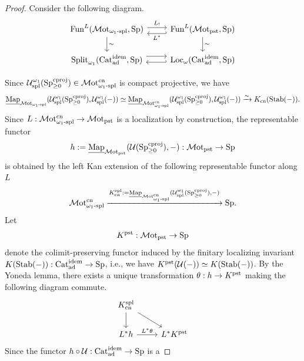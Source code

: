 \documentclass[a4paper,10pt, oneside]{amsart}
\begin{document}
\begin{proof}
	Consider the following diagram.
	$$\begin{tikzcd}
		{\funct^L(\motomegaonespl,\opsp)} \arrow[d, "\sim"] \arrow[r, "L_!",shift left] & {\funct^L(\motpst,\opsp)} \arrow[l, "L^*",hook', shift left=2] \arrow[d, "\sim"] \\
		{\Split_{\omega_1}(\catadidem,\opsp)} \arrow[r, shift left=2]                    & {\Loc_\omega(\catadidem,\opsp)} \arrow[l, hook', shift left]            
	\end{tikzcd}$$

	Since $\mcu_{\op{spl}}^{\omega_1}(\spgeqcproj)\in \motomegaonesplcn$ is compact projective, we have $$\unmap_{\motomegaonespl}(\mcu_{\op{spl}}^{\omega_1}(\spgeqcproj),\mcu_{\op{spl}}^{\omega_1}(-))\simeq\unmap_{\motomegaonesplcn}(\mcu_{\op{spl}}^{\omega_1}(\spgeqcproj),\mcu_{\op{spl}}^{\omega_1}(-))\xrightarrow{\sim} \kcn(\op{Stab}(-)).$$
	Since $L:\motomegaonesplcn\to \motpst$ is a localization by construction, the representable functor $$h:=\unmap_{\motpst}(\mcu(\spgeqcproj),-):\motpst\to \opsp$$ is obtained by the left Kan extension  of the following representable functor along $L$ $$\motomegaonesplcn\xrightarrow{\kcn^{\op{spl}}:=\unmap_{\motomegaonesplcn}(\mcu_{\op{spl}}^{\omega_1}(\spgeqcproj),-)}\opsp.$$
	Let $$K^{\op{pst}}:\motpst\to\opsp$$ denote the colimit-preserving functor induced by the finitary localizing invariant $K(\stab(-)):\catadidem\to \opsp$, i.e., we have $K^{\op{pst}}(\mcu(-))\simeq K(\stab(-))$.
	By the Yoneda lemma, there exists a unique transformation $\theta:h\to K^{\op{pst}}$ making the following diagram  commute.
	$$\begin{tikzcd}
		\kcn^{\op{spl}} \arrow[d] \arrow[rd] &                  \\
		L^*h \arrow[r, "L^*\theta"]          & L^* K^{\op{pst}}
	\end{tikzcd}$$
	Since %
	the functor $h\circ\mcu:\catadidem\to\opsp$ is a %

\end{proof}
\end{document}
